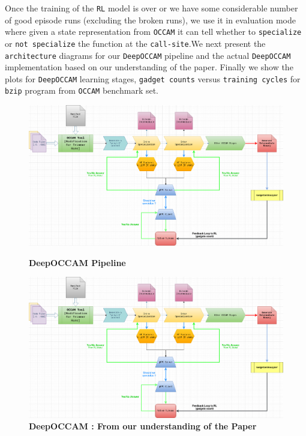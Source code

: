 \documentclass{relatorio}
\begin{document}
Once the training of the \texttt{RL} model is over or we have some considerable number of good episode runs (excluding the broken runs), we use it in evaluation mode where given a state representation from \texttt{OCCAM} it can tell whether to \texttt{specialize} or \texttt{not specialize} the function at the \texttt{call-site}.We next present the \texttt{architecture} diagrams for our \texttt{DeepOCCAM} pipeline and the actual \texttt{DeepOCCAM} implementation based on our understanding of the paper. 
Finally we show the plots for \texttt{DeepOCCAM} learning stages, \texttt{gadget counts} versus \texttt{training cycles} for \texttt{bzip} program from \texttt{OCCAM} benchmark set.

\onecolumn
\begin{figure}[H]
	\centering
	\captionsetup{justification=centering}
	\includegraphics[width=1\linewidth]{imgs/deepoccam-pipeline.png}
	\caption{\textbf{DeepOCCAM Pipeline}}%
	\label{fig:plant}
	\centering
	\captionsetup{justification=centering}
	\includegraphics[width=1\linewidth]{imgs/DeepOCCAM-Pipeline.png}
	\caption{\textbf{DeepOCCAM : \color{blue} From our understanding of the Paper}}%
	\label{fig:plant}
\end{figure}
\twocolumn
\end{document}

